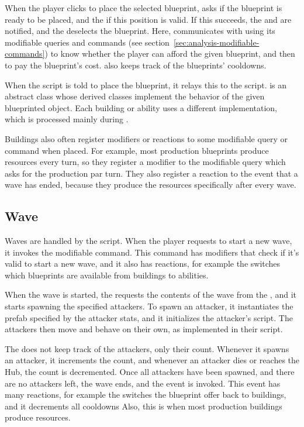 When the player clicks to place the selected blueprint,  asks  if the blueprint is ready to be placed, and the  if this position is valid.
If this succeeds, the  and  are notified, and the  deselects the blueprint.
Here,  communicates with  using its modifiable queries and commands (see section~\ref{sec:analysis-modifiable-commands}) to know whether the player can afford the given blueprint, and then to pay the blueprint's cost.
 also keeps track of the blueprints' cooldowns.

When the  script is told to place the blueprint, it relays this to the  script.
 is an abstract class whose derived classes implement the behavior of the given blueprinted object.
Each building or ability uses a different implementation, which is processed mainly during .

Buildings also often register modifiers or reactions to some modifiable query or command when placed.
For example, most production blueprints produce resources every turn, so they register a modifier to the modifiable query which asks for the production par turn.
They also register a reaction to the event that a wave has ended, because they produce the resources specifically after every wave.

\subsection{Wave}

Waves are handled by the  script.
When the player requests to start a new wave, it invokes the  modifiable command.
This command has modifiers that check if it's valid to start a new wave, and it also has reactions, for example the  switches which blueprints are available from buildings to abilities.

When the wave is started, the  requests the contents of the wave from the , and it starts spawning the specified attackers.
To spawn an attacker, it instantiates the prefab specified by the attacker stats, and it initializes the attacker's  script.
The attackers then move and behave on their own, as implemented in their  script.

The  does not keep track of the attackers, only their count.
Whenever it spawns an attacker, it increments the count, and whenever an attacker dies or reaches the Hub, the count is decremented.
Once all attackers have been spawned, and there are no attackers left, the wave ends, and the  event is invoked.
This event has many reactions, for example the  switches the blueprint offer back to buildings, and it decrements all cooldowns
Also, this is when most production buildings produce resources.

